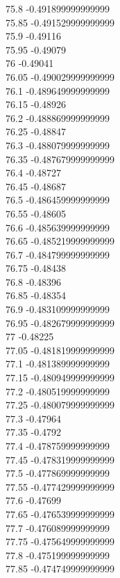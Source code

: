 {75.8	-0.491899999999999\\
75.85	-0.491529999999999\\
75.9	-0.49116\\
75.95	-0.49079\\
76	-0.49041\\
76.05	-0.490029999999999\\
76.1	-0.489649999999999\\
76.15	-0.48926\\
76.2	-0.488869999999999\\
76.25	-0.48847\\
76.3	-0.488079999999999\\
76.35	-0.487679999999999\\
76.4	-0.48727\\
76.45	-0.48687\\
76.5	-0.486459999999999\\
76.55	-0.48605\\
76.6	-0.485639999999999\\
76.65	-0.485219999999999\\
76.7	-0.484799999999999\\
76.75	-0.48438\\
76.8	-0.48396\\
76.85	-0.48354\\
76.9	-0.483109999999999\\
76.95	-0.482679999999999\\
77	-0.48225\\
77.05	-0.481819999999999\\
77.1	-0.481389999999999\\
77.15	-0.480949999999999\\
77.2	-0.480519999999999\\
77.25	-0.480079999999999\\
77.3	-0.47964\\
77.35	-0.4792\\
77.4	-0.478759999999999\\
77.45	-0.478319999999999\\
77.5	-0.477869999999999\\
77.55	-0.477429999999999\\
77.6	-0.47699\\
77.65	-0.476539999999999\\
77.7	-0.476089999999999\\
77.75	-0.475649999999999\\
77.8	-0.475199999999999\\
77.85	-0.474749999999999\\
}
